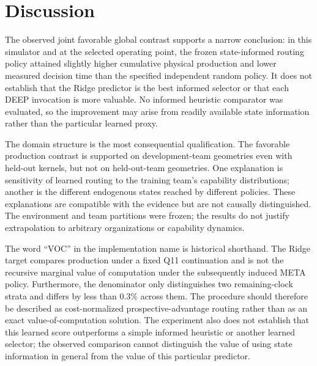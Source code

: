 \documentclass[11pt]{article}
\begin{document}
\section{Discussion}
The observed joint favorable global contrast supports a narrow conclusion: in this simulator and at the selected operating point, the frozen state-informed routing policy attained slightly higher cumulative physical production and lower measured decision time than the specified independent random policy. It does not establish that the Ridge predictor is the best informed selector or that each DEEP invocation is more valuable. No informed heuristic comparator was evaluated, so the improvement may arise from readily available state information rather than the particular learned proxy.

The domain structure is the most consequential qualification. The favorable production contrast is supported on development-team geometries even with held-out kernels, but not on held-out-team geometries. One explanation is sensitivity of learned routing to the training team's capability distributions; another is the different endogenous states reached by different policies. These explanations are compatible with the evidence but are not causally distinguished. The environment and team partitions were frozen; the results do not justify extrapolation to arbitrary organizations or capability dynamics.

The word ``VOC'' in the implementation name is historical shorthand. The Ridge target compares production under a fixed Q11 continuation and is not the recursive marginal value of computation under the subsequently induced META policy. Furthermore, the denominator only distinguishes two remaining-clock strata and differs by less than 0.3\% across them. The procedure should therefore be described as cost-normalized prospective-advantage routing rather than as an exact value-of-computation solution. The experiment also does not establish that this learned score outperforms a simple informed heuristic or another learned selector; the observed comparison cannot distinguish the value of using state information in general from the value of this particular predictor.
\end{document}
